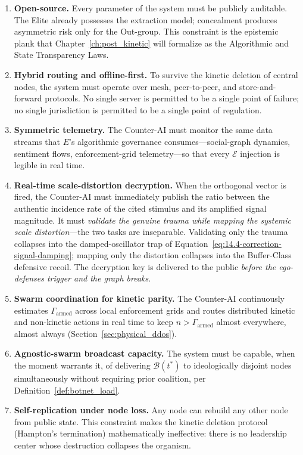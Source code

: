 \begin{enumerate}
    \item \textbf{Open-source.} Every parameter of the system must be publicly auditable. The Elite already possesses the extraction model; concealment produces asymmetric risk only for the Out-group. This constraint is the epistemic plank that Chapter~\ref{ch:post_kinetic} will formalize as the Algorithmic and State Transparency Laws.
    \item \textbf{Hybrid routing and offline-first.} To survive the kinetic deletion of central nodes, the system must operate over mesh, peer-to-peer, and store-and-forward protocols. No single server is permitted to be a single point of failure; no single jurisdiction is permitted to be a single point of regulation.
    \item \textbf{Symmetric telemetry.} The Counter-AI must monitor the same data streams that $E$'s algorithmic governance consumes---social-graph dynamics, sentiment flows, enforcement-grid telemetry---so that every $\mathcal{E}$ injection is legible in real time.
    \item \textbf{Real-time scale-distortion decryption.} When the orthogonal vector is fired, the Counter-AI must immediately publish the ratio between the authentic incidence rate of the cited stimulus and its amplified signal magnitude. It must \textit{validate the genuine trauma while mapping the systemic scale distortion}---the two tasks are inseparable. Validating only the trauma collapses into the damped-oscillator trap of Equation~\eqref{eq:14.4-correction-signal-damping}; mapping only the distortion collapses into the Buffer-Class defensive recoil. The decryption key is delivered to the public \textit{before the ego-defenses trigger and the graph breaks}.
    \item \textbf{Swarm coordination for kinetic parity.} The Counter-AI continuously estimates $\Gamma_{\text{armed}}$ across local enforcement grids and routes distributed kinetic and non-kinetic actions in real time to keep $n > \Gamma_{\text{armed}}$ almost everywhere, almost always (Section~\ref{sec:physical_ddos}).
    \item \textbf{Agnostic-swarm broadcast capacity.} The system must be capable, when the moment warrants it, of delivering $\mathcal{B}(t^{*})$ to ideologically disjoint nodes simultaneously without requiring prior coalition, per Definition~\ref{def:botnet_load}.
    \item \textbf{Self-replication under node loss.} Any node can rebuild any other node from public state. This constraint makes the kinetic deletion protocol (Hampton's termination) mathematically ineffective: there is no leadership center whose destruction collapses the organism.

\end{enumerate}
